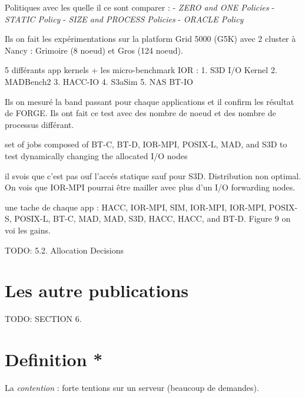 \documentclass[10pt, a4paper]{article}
\begin{document}
Politiques avec les quelle il ce sont comparer :
- \emph{ZERO and ONE Policies}
- \emph{STATIC Policy}
- \emph{SIZE and PROCESS Policies}
- \emph{ORACLE Policy}


Ils on fait les expérimentations sur la platform Grid 5000 (G5K) avec 2 cluster à Nancy : Grimoire (8 noeud) et Gros (124 noeud). %

5 différants app kernels + les micro-benchmark IOR :
1. S3D I/O Kernel
2. MADBench2
3. HACC-IO
4. S3aSim
5. NAS BT-IO

Ils on mesuré la band passant pour chaque applications et il confirm les résultat de FORGE. Ils ont fait ce test avec des nombre de noeud et des nombre de processus différant.

set of jobs composed of BT-C, BT-D, IOR-MPI, POSIX-L, MAD, and S3D to test dynamically changing the allocated I/O nodes

il svois que c'est pas ouf l'accés statique sauf pour S3D. Distribution non optimal. On vois que IOR-MPI pourrai être mailler avec plus d'un I/O forwarding nodes.

une tache de chaque app : HACC, IOR-MPI, SIM, IOR-MPI, IOR-MPI, POSIX-S, POSIX-L, BT-C, MAD, MAD, S3D, HACC, HACC, and BT-D. Figure 9 on voi les gains.



TODO: 5.2. Allocation Decisions


\section{Les autre publications}

TODO: SECTION 6.

\section{Definition *}

La \emph{contention} : forte tentions sur un serveur (beaucoup de demandes).
\end{document}

